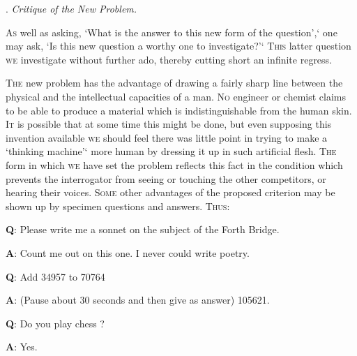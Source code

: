 \documentclass[10pt]{article} %
\begin{document}
\vspace{0.5\baselineskip} %
\noindent{}. \textit{Critique of the New Problem.}
\vspace{0.5\baselineskip} %

\textsc{As} well as asking, `What is the answer to this new form of the question',` one may ask, `Is this new question a worthy one to investigate?'` \textsc{This} latter question \textsc{we} investigate without further ado, thereby cutting short an infinite regress.

\textsc{The} new problem has the advantage of drawing a fairly sharp line between the physical and the intellectual capacities of a man. \textsc{No} engineer or chemist claims to be able to produce a material which is indistinguishable from the human skin. \textsc{It} is possible that at some time this might be done, but even supposing this invention available \textsc{we} should feel there was little point in trying to make a `thinking machine'` more human by dressing it up in such artificial flesh. \textsc{The} form in which \textsc{we} have set the problem reflects this fact in the condition which prevents the interrogator from seeing or touching the other competitors, or hearing their voices. \textsc{Some} other advantages of the proposed criterion may be shown up by specimen questions and answers. \textsc{Thus}:

\vspace{0.5\baselineskip} %
\textbf{Q}: Please write me a sonnet on the subject of the Forth Bridge.\par
\textbf{A}: Count me out on this one. \textsc{I} never could write poetry.\par
\vspace{0.2\baselineskip} %
\textbf{Q}: Add 34957 to 70764\par
\textbf{A}: (Pause about 30 seconds and then give as answer) 105621.\par
\vspace{0.2\baselineskip} %
\textbf{Q}: Do you play chess ?\par
\textbf{A}: Yes.
\end{document}

